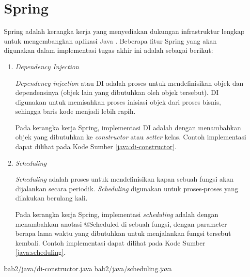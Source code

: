 \section{Spring}
\par Spring adalah kerangka kerja yang menyediakan dukungan infrastruktur lengkap untuk mengembangkan aplikasi Java \cite{spring-online}. Beberapa fitur Spring yang akan digunakan dalam implementasi tugas akhir ini adalah sebagai berikut:
\begin{enumerate}[listparindent=2.5em]
	\item \textit{Dependency Injection}
	\par \textit{Dependency injection} atau DI adalah proses untuk mendefinisikan objek dan dependensinya (objek lain yang dibutuhkan oleh objek tersebut). DI digunakan untuk memisahkan proses inisiasi objek dari proses bisnis, sehingga baris kode menjadi lebih rapih.
	\par Pada kerangka kerja Spring, implementasi DI adalah dengan menambahkan objek yang dibutuhkan ke \textit{constructor} atau \textit{setter} kelas. Contoh implementasi dapat dilihat pada Kode Sumber \ref{java:di-constructor}.
	\item \textit{Scheduling}
	\par \textit{Scheduling} adalah proses untuk mendefinisikan kapan sebuah fungsi akan dijalankan secara periodik. \textit{Scheduling} digunakan untuk proses-proses yang dilakukan berulang kali.
	\par Pada kerangka kerja Spring, implementasi \textit{scheduling} adalah dengan menambahkan anotasi @Scheduled di sebuah fungsi, dengan parameter berapa lama waktu yang dibutuhkan untuk menjalankan fungsi tersebut kembali. Contoh implementasi dapat dilihat pada Kode Sumber \ref{java:scheduling}.
\end{enumerate}
 {bab2/java/di-constructor.java}
 {bab2/java/scheduling.java}

